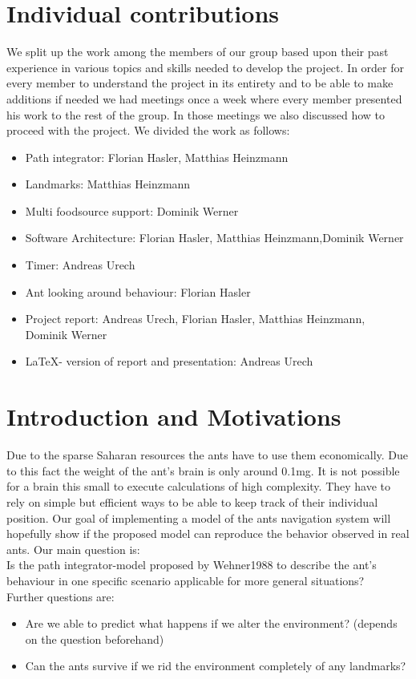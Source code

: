 \documentclass[11pt]{article}
\begin{document}
\section{Individual contributions}
We split up the work among the members of our group based upon their past experience in various topics and skills needed to develop the project. 
In order for every member to understand the project in its entirety and to be able to make additions if needed we had meetings once a week where every member presented his work to the rest of the group. In those meetings we also discussed how to proceed with the project.
We divided the work as follows:
\begin{itemize}
\item Path integrator: Florian Hasler, Matthias Heinzmann
\item Landmarks: Matthias Heinzmann
\item Multi foodsource support: Dominik Werner
\item Software Architecture: Florian Hasler, Matthias Heinzmann,Dominik Werner
\item Timer: Andreas Urech
\item Ant looking around behaviour: Florian Hasler
\item Project report: Andreas Urech, Florian Hasler, Matthias Heinzmann, Dominik Werner
\item \LaTeX - version of report and presentation: Andreas Urech
\end{itemize}

\section{Introduction and Motivations}
 Due to the sparse Saharan resources the ants have to use them economically. Due to this fact the weight of the ant's brain is only around 0.1mg. It is not possible for a brain this small to execute calculations of high complexity. They have to rely on simple but efficient ways to be able to keep track of their individual position. Our goal of implementing a model of the ants navigation system will hopefully show if the proposed model can reproduce the behavior observed in real ants.
Our main question is:\\
Is the path integrator-model proposed by Wehner1988 \cite{Wehner1988} to describe the ant's behaviour in one specific scenario applicable for more general situations?\\
Further questions are:
\begin{itemize}
\item Are we able to predict what happens if we alter the environment? (depends on the question beforehand) 
\item Can the ants survive if we rid the environment completely of any landmarks? 
\end{itemize}
\end{document}
